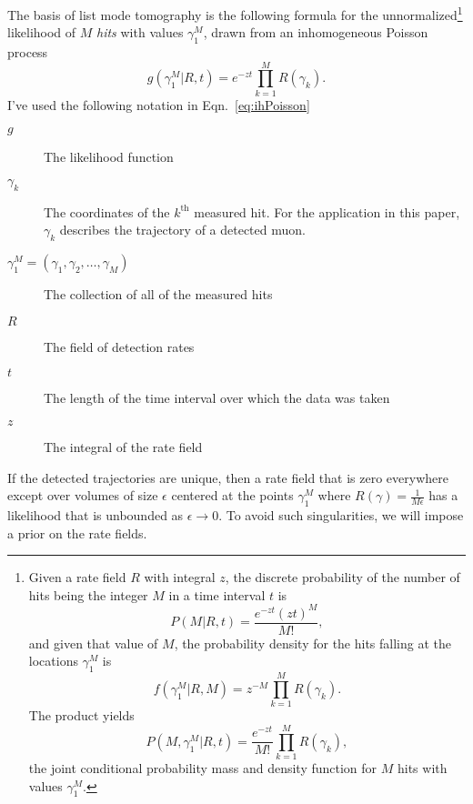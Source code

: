 \documentclass[twocolumn]{article}
\newcommand{\like}{g}
\newcommand{\z}{z}%
\begin{document}
The basis of list mode tomography is the following formula for the
unnormalized\footnote{Given a rate field $R$ with integral $z$, the
  discrete probability of the number of hits being the integer $M$ in
  a time interval $t$ is
  \begin{equation*}
    P(M|R,t) = \frac{e^{-zt} (zt)^M}{M!},
  \end{equation*}
  and given that value of $M$, the probability density for the hits
  falling at the locations $\gamma_1^M$ is
  \begin{equation*}
    f(\gamma_1^M|R,M) = z^{-M} \prod_{k=1}^M R(\gamma_k).
  \end{equation*}
  The product yields
  \begin{equation*}
    P(M,\gamma_1^M|R,t) = \frac{e^{-\z t}}{M!} \prod_{k=1}^M  R(\gamma_k),
  \end{equation*}
  the joint conditional probability mass and density function for
  $M$ hits with values $\gamma_1^M$.} likelihood of $M$ \emph{hits}
with values $\gamma_1^M$, drawn from an inhomogeneous Poisson process
\begin{equation}
  \label{eq:ihPoisson}
  \like(\gamma_1^M|R,t) = e^{-\z t} \prod_{k=1}^M  R(\gamma_k).
\end{equation}
I've used the following notation in Eqn.~\ref{eq:ihPoisson}
\begin{description}
\item[$\like$] The likelihood function
\item[$\gamma_k$] The coordinates of the $k^{\text{th}}$ measured
  hit.  For the application in this paper, $\gamma_k$ describes the
  trajectory of a detected muon.
\item[$\gamma_1^M=(\gamma_1,\gamma_2,\ldots,\gamma_M)$] The collection
  of all of the measured hits
\item[$R$] The field of detection rates
\item[$t$] The length of the time interval over which the data was
  taken
\item[$\z$] The integral of the rate field
\end{description}

If the detected trajectories are unique, then a rate field that is
zero everywhere except over volumes of size $\epsilon$ centered at the
points $\gamma_1^M$ where $R(\gamma)=\frac{1}{M\epsilon}$ has a
likelihood that is unbounded as $\epsilon \rightarrow 0$.  To avoid
such singularities, we will impose a prior on the rate fields.
\end{document}
